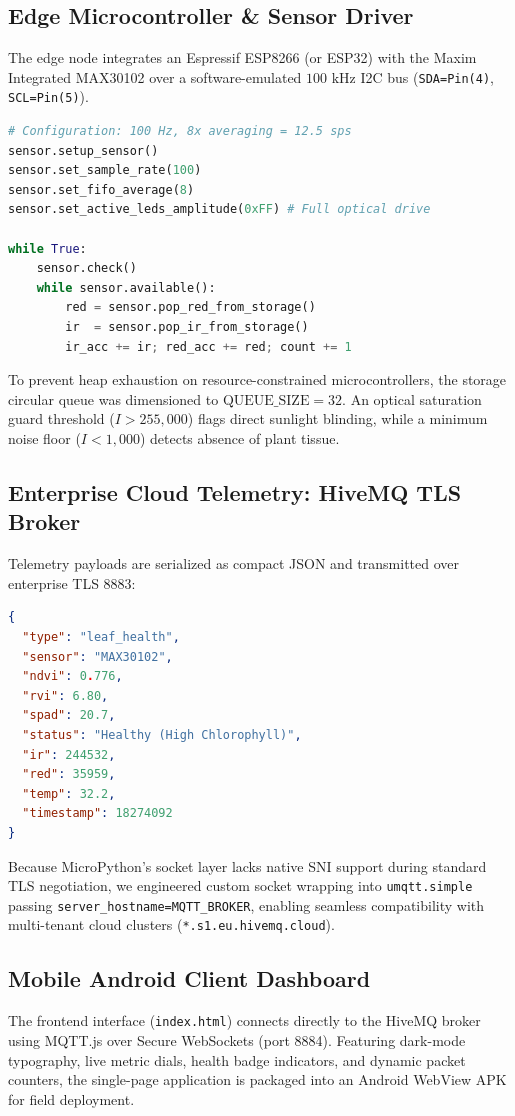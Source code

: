 \documentclass[9pt,twocolumn,a4paper,landscape]{article}
\begin{document}
\subsection{Edge Microcontroller \& Sensor Driver}
The edge node integrates an Espressif ESP8266 (or ESP32) with the Maxim Integrated MAX30102 over a software-emulated $100\text{ kHz}$ I2C bus (\texttt{SDA=Pin(4)}, \texttt{SCL=Pin(5)}). 

\begin{lstlisting}[language=Python, caption={Edge Sensor Acquisition and Buffer Management}]
# Configuration: 100 Hz, 8x averaging = 12.5 sps
sensor.setup_sensor()
sensor.set_sample_rate(100)
sensor.set_fifo_average(8)
sensor.set_active_leds_amplitude(0xFF) # Full optical drive

while True:
    sensor.check()
    while sensor.available():
        red = sensor.pop_red_from_storage()
        ir  = sensor.pop_ir_from_storage()
        ir_acc += ir; red_acc += red; count += 1
\end{lstlisting}

To prevent heap exhaustion on resource-constrained microcontrollers, the storage circular queue was dimensioned to $\text{QUEUE\_SIZE} = 32$. An optical saturation guard threshold ($I > 255,000$) flags direct sunlight blinding, while a minimum noise floor ($I < 1,000$) detects absence of plant tissue.

\subsection{Enterprise Cloud Telemetry: HiveMQ TLS Broker}
Telemetry payloads are serialized as compact JSON and transmitted over enterprise TLS 8883:
\begin{lstlisting}[language=JSON, caption={Real-Time Edge MQTT Payload}]
{
  "type": "leaf_health",
  "sensor": "MAX30102",
  "ndvi": 0.776,
  "rvi": 6.80,
  "spad": 20.7,
  "status": "Healthy (High Chlorophyll)",
  "ir": 244532,
  "red": 35959,
  "temp": 32.2,
  "timestamp": 18274092
}
\end{lstlisting}

Because MicroPython's socket layer lacks native SNI support during standard TLS negotiation, we engineered custom socket wrapping into \texttt{umqtt.simple} passing \texttt{server\_hostname=MQTT\_BROKER}, enabling seamless compatibility with multi-tenant cloud clusters (\texttt{*.s1.eu.hivemq.cloud}).

\subsection{Mobile Android Client Dashboard}
The frontend interface (\texttt{index.html}) connects directly to the HiveMQ broker using MQTT.js over Secure WebSockets (port 8884). Featuring dark-mode typography, live metric dials, health badge indicators, and dynamic packet counters, the single-page application is packaged into an Android WebView APK for field deployment.
\end{document}
